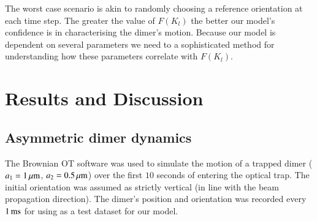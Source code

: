 \documentclass[final,  3p]{elsarticle}
\begin{document}
The worst case scenario is akin to randomly choosing a reference orientation at each time step. The greater the value of $F(K_l)$ the better our model's confidence is in characterising the dimer's motion. Because our model is dependent on several parameters we need to a sophisticated method for understanding how these parameters correlate with $F(K_l)$.


\section{Results and  Discussion
\label{sec:Discussion}}


\subsection{Asymmetric dimer dynamics}
\label{sec:motion}

The Brownian OT software was used to simulate the motion of a trapped
dimer ($a_1=1\,\mu{\rm m}$, $a_2=0.5\,\mu{\rm m}$) over the first
$10$ seconds of entering the optical trap.  The initial orientation
was assumed as strictly vertical (in line with the beam propagation
direction). The dimer's position and orientation was recorded every
$1\,{\rm ms}$ for using as a test dataset for our model.
\end{document}

